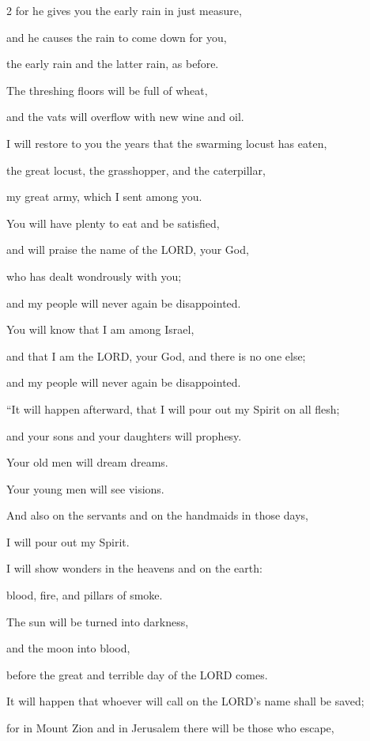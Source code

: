 \begin{multicols}{2}
for he gives you the early rain in just measure,

and he causes the rain to come down for you,

the early rain and the latter rain, as before.

\myverse{}The threshing floors will be full of wheat,

and the vats will overflow with new wine and oil.

\myverse{}I will restore to you the years that the swarming locust has
eaten,

the great locust, the grasshopper, and the caterpillar,

my great army, which I sent among you.

\myverse{}You will have plenty to eat and be satisfied,

and will praise the name of the LORD, your God,

who has dealt wondrously with you;

and my people will never again be disappointed.

\myverse{}You will know that I am among Israel,

and that I am the LORD, your God, and there is no one else;

and my people will never again be disappointed.


\vspace{\baselineskip} 
\myverse{}“It will happen afterward, that I will pour out my Spirit on
all flesh;

and your sons and your daughters will prophesy.

Your old men will dream dreams.

Your young men will see visions.

\myverse{}And also on the servants and on the handmaids in those days,

I will pour out my Spirit.

\myverse{}I will show wonders in the heavens and on the earth:

blood, fire, and pillars of smoke.

\myverse{}The sun will be turned into darkness,

and the moon into blood,

before the great and terrible day of the LORD comes.

\myverse{}It will happen that whoever will call on the LORD’s name shall
be saved;

for in Mount Zion and in Jerusalem there will be those who escape,


\end{multicols}
